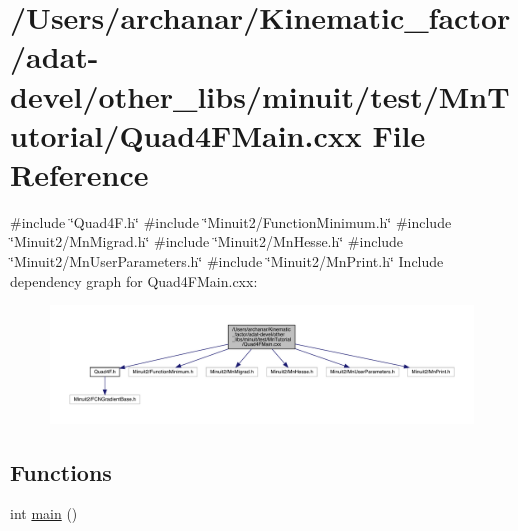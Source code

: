 \hypertarget{adat-devel_2other__libs_2minuit_2test_2MnTutorial_2Quad4FMain_8cxx}{}\section{/\+Users/archanar/\+Kinematic\+\_\+factor/adat-\/devel/other\+\_\+libs/minuit/test/\+Mn\+Tutorial/\+Quad4\+F\+Main.cxx File Reference}
\label{adat-devel_2other__libs_2minuit_2test_2MnTutorial_2Quad4FMain_8cxx}
{\ttfamily \#include \char`\"{}Quad4\+F.\+h\char`\"{}}\newline
{\ttfamily \#include \char`\"{}Minuit2/\+Function\+Minimum.\+h\char`\"{}}\newline
{\ttfamily \#include \char`\"{}Minuit2/\+Mn\+Migrad.\+h\char`\"{}}\newline
{\ttfamily \#include \char`\"{}Minuit2/\+Mn\+Hesse.\+h\char`\"{}}\newline
{\ttfamily \#include \char`\"{}Minuit2/\+Mn\+User\+Parameters.\+h\char`\"{}}\newline
{\ttfamily \#include \char`\"{}Minuit2/\+Mn\+Print.\+h\char`\"{}}\newline
Include dependency graph for Quad4\+F\+Main.\+cxx\+:
\nopagebreak
\begin{figure}[H]
\begin{center}
\leavevmode
\includegraphics[width=350pt]{d7/d7a/adat-devel_2other__libs_2minuit_2test_2MnTutorial_2Quad4FMain_8cxx__incl}
\end{center}
\end{figure}
\subsection*{Functions}
\begin{DoxyCompactItemize}
\item 
int \mbox{\hyperlink{adat-devel_2other__libs_2minuit_2test_2MnTutorial_2Quad4FMain_8cxx_ae66f6b31b5ad750f1fe042a706a4e3d4}{main}} ()
\end{DoxyCompactItemize}


